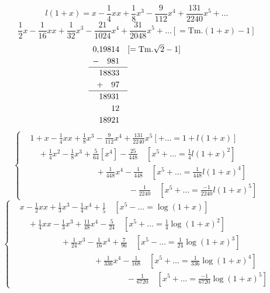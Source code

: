 \begin{equation}\tag*{[6]}l(1+x)=x-\frac14xx+\frac18x^3-\frac9{112}x^4+\frac{131}{2240}x^5+\ldots\end{equation}
{\small\begin{equation}\tag*{[7]}
\frac12x-\frac1{16}xx+\frac1{32}x^3-\frac{21}{1024}x^4+\frac{31}{2048}x^5+\ldots[=\mathrm{Tm.}(1+x)-1]
\end{equation}}
\ClosingRule
\[\renewcommand{\arraystretch}{1.2}\begin{array}{r@{\quad}l}
0{,}19814&[=\mathrm{Tm.}\sqrt2-1]\\
-\quad981&\\\cline{1-1}
18833&\\
+\quad97&\\\cline{1-1}
18931&\\
12&\\
18921&
\end{array}\]
\clearpage
{}\fancyhead{}
{\footnotesize\begin{equation}\tag*{[8]}
\left\{\begin{aligned}
&1+x-\frac14xx+\frac18x^3-\frac9{112}x^4+\frac{131}{2240}x^5[+\ldots=1+l(1+x)]\\[5pt]
&\quad+\frac14x^2-\frac18x^3+\frac5{64}[x^4]-\frac{25}{448}\quad[x^5+\ldots=\tfrac14l(1+x)^2]\\[5pt]
&\hspace{8em}+\frac1{448}x^4-\frac1{448}\quad[x^5+\ldots=\tfrac1{448}l(1+x)^4]\\[5pt]
&\hspace{12em}-\frac1{2240}\quad[x^5+\ldots=\tfrac{-1}{2240}l(1+x)^5]
\end{aligned}\right.
\end{equation}}
\ClosingRule
{\footnotesize\begin{equation}\tag*{[9]}
\left\{\begin{aligned}
&x-\frac12xx+\frac13x^3-\frac14x^4+\frac15\quad[x^5-\ldots=\log(1+x)]\\[5pt]
&\quad+\frac14xx-\frac13x^3+\frac{11}{48}x^4-\frac5{24}\quad[x^5+\ldots=\tfrac14\log(1+x)^2]\\[5pt]
&\hspace{5em}+\frac1{24}x^3-\frac1{16}x^4+\frac7{96}\quad[x^5-\ldots=\tfrac1{24}\log(1+x)^3]\\[5pt]
&\hspace{9em}+\frac1{336}x^4-\frac1{168}\quad[x^5+\ldots=\tfrac1{336}\log(1+x)^4]\\[5pt]
&\hspace{13em}-\frac1{6720}\quad[x^5+\ldots=\tfrac{-1}{6720}\log(1+x)^5]
\end{aligned}\right.
\end{equation}}
